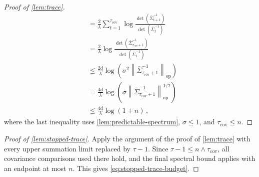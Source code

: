 \documentclass{article}
\newcommand{\op}{\mathrm{op}}
\newcommand{\1}{\mathbf 1}
\newcommand{\norm}[1]{\left\lVert #1\right\rVert}
\begin{document}
\begin{proof}[Proof of \cref{lem:trace}]
\begin{align}
         & =
        \frac2\lambda\sum_{t=1}^{\tau_{\mathrm{cov}}}
        \log\frac{\det(\bar{\Sigma}_{t+1}^{-1})}
        {\det(\bar{\Sigma}_t^{-1})} \\
         & =
        \frac2\lambda
        \log\frac{\det(\bar{\Sigma}_{\tau_{\mathrm{cov}}+1}^{-1})}
        {\det(\bar{\Sigma}_1^{-1})} \\
         & \leq
        \frac{2d}{\lambda}
        \log\left(
        \sigma^2
        \norm{\bar{\Sigma}_{\tau_{\mathrm{cov}}+1}^{-1}}_{\op}
        \right)                     \\
         & =
        \frac{4d}{\lambda}
        \log\left(
        \sigma
        \norm{\bar{\Sigma}_{\tau_{\mathrm{cov}}+1}^{-1}}_{\op}^{1/2}
        \right)                     \\
         & \leq
        \frac{4d}{\lambda}
        \log\left(1+n\right)\,,
    \end{align}
    where the last inequality
    uses \cref{lem:predictable-spectrum},
    $\sigma\leq1$, and $\tau_{\mathrm{cov}}\leq n$.
\end{proof}


\begin{proof}[Proof of \cref{lem:stopped-trace}]
    Apply the argument of the proof of \cref{lem:trace} with every upper
    summation limit replaced by $\tau-1$. Since
    $\tau-1\leq n\wedge\tau_{\mathrm{cov}}$, all covariance comparisons
    used there hold, and the final spectral bound applies with an endpoint
    at most $n$. This gives \eqref{eq:stopped-trace-budget}.
\end{proof}
\end{document}
